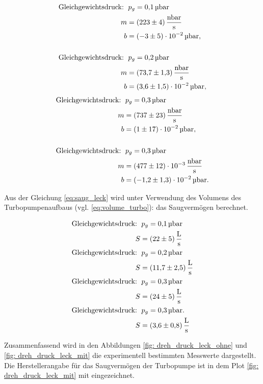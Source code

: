 \begin{align*}
  \text{Gleichgewichtsdruck: } &\, p_g=\SI{0.1}{\micro\bar} \\
  m&= \SI{223\pm 4}{\nano\bar\per\second}\\
  b&=\SI{-3\pm5 e-2}{\micro\bar},\\
  \\
  \text{Gleichgewichtsdruck: } &\, p_g=\SI{0.2}{\micro\bar} \\
  m&= \SI{73.7\pm 1.3 }{\nano\bar\per\second}\\
  b&=\SI{3.6\pm 1.5 e-2}{\micro\bar},\\
\end{align*}
\begin{align*}
  \text{Gleichgewichtsdruck: } &\, p_g=\SI{0.3}{\micro\bar} \\
  m&= \SI{737\pm 23 }{\nano\bar\per\second}\\
  b&=\SI{1\pm 17 e-2}{\micro\bar},\\
  \\
  \text{Gleichgewichtsdruck: } &\, p_g=\SI{0.3}{\micro\bar} \\
  m&= \SI{477\pm 12 e-3 }{\nano\bar\per\second}\\
  b&=\SI{-1.2\pm 1.3 e-2}{\micro\bar}.\\
\end{align*}

Aus der Gleichung \eqref{eq:saug_leck} wird unter Verwendung des Volumens des Turbopumpenaufbaus (vgl. \eqref{eq:volume_turbo}): %
das Saugvermögen berechnet.

\begin{align*}
  \text{Gleichgewichtsdruck: } &\, p_g=\SI{0.1}{\micro\bar} \\
  S&=\SI{22\pm 5}{\litre\per\second}
  \\
  \text{Gleichgewichtsdruck: } &\, p_g=\SI{0.2}{\micro\bar} \\
  S&=\SI{11.7\pm 2.5}{\litre\per\second}
  \\
  \text{Gleichgewichtsdruck: } &\, p_g=\SI{0.3}{\micro\bar} \\
  S&=\SI{24\pm 5}{\litre\per\second}
  \\
  \text{Gleichgewichtsdruck: } &\, p_g=\SI{0.3}{\micro\bar}. \\
  S&=\SI{3.6\pm 00.8}{\litre\per\second}
\end{align*}

Zusammenfassend wird in den Abbildungen \ref{fig: dreh_druck_leck_ohne} und \ref{fig: dreh_druck_leck_mit} die experimentell bestimmten Messwerte
dargestellt. Die Herstellerangabe für das Saugvermögen der Turbopumpe ist in dem Plot \ref{fig: dreh_druck_leck_mit}
mit eingezeichnet.

